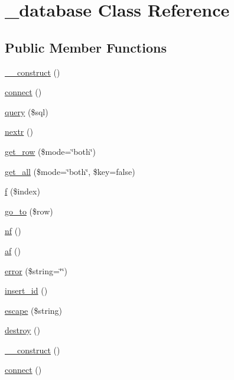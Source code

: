 \hypertarget{class__database}{
\section{\_\-database Class Reference}
\label{class__database}
}
\subsection*{Public Member Functions}
\begin{DoxyCompactItemize}
\item 
\hyperlink{class__database_a095c5d389db211932136b53f25f39685}{\_\-\_\-construct} ()
\item 
\hyperlink{class__database_a78572828d11dcdf2a498497d9001d557}{connect} ()
\item 
\hyperlink{class__database_a6b251c8058230359b2922377699c4f29}{query} (\$sql)
\item 
\hyperlink{class__database_aea18ceaf3a26a43a17ac75a1deae8eb5}{nextr} ()
\item 
\hyperlink{class__database_af3975c6052edb19e579b858ade41a833}{get\_\-row} (\$mode=\char`\"{}both\char`\"{})
\item 
\hyperlink{class__database_aab759ecaf5cca95ae93a43f3ae01eb1c}{get\_\-all} (\$mode=\char`\"{}both\char`\"{}, \$key=false)
\item 
\hyperlink{class__database_a2470114c975ff2d134f750d82b92ab13}{f} (\$index)
\item 
\hyperlink{class__database_af63fb7393e4693d1f2f2a324e3b3f3f2}{go\_\-to} (\$row)
\item 
\hyperlink{class__database_a488ba76d7261d5bd6a2d01ab8dd6da0d}{nf} ()
\item 
\hyperlink{class__database_aa186461b75e39e01df8ec9d05bc56e5f}{af} ()
\item 
\hyperlink{class__database_ad4b2a8a3e107f7ed256cb345303c82cd}{error} (\$string=\char`\"{}\char`\"{})
\item 
\hyperlink{class__database_a933f2cde8dc7f87875e257d0a4902e99}{insert\_\-id} ()
\item 
\hyperlink{class__database_a812cda4574715397b7ffd0be994adf10}{escape} (\$string)
\item 
\hyperlink{class__database_aa118461de946085fe42989193337044a}{destroy} ()
\item 
\hyperlink{class__database_a095c5d389db211932136b53f25f39685}{\_\-\_\-construct} ()
\item 
\hyperlink{class__database_a78572828d11dcdf2a498497d9001d557}{connect} ()

\end{DoxyCompactItemize}
